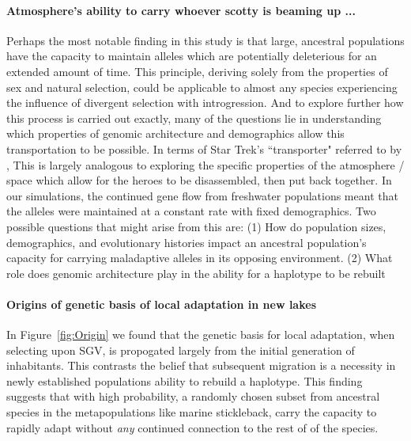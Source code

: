 \documentclass{article}
\begin{document}
 \paragraph{Atmosphere's ability to carry whoever scotty is beaming up ... }
Perhaps the most notable finding in this study is that large, ancestral populations have the capacity to maintain alleles which are potentially deleterious for an extended amount of time.  
This principle, deriving solely from the properties of sex and natural selection, could be applicable to almost any species experiencing the influence of divergent selection with introgression.
And to explore further how this process is carried out exactly, many of the questions lie in understanding which properties of genomic architecture and demographics allow this transportation to be possible. 
In terms of Star Trek's ``transporter" referred to by \citet{schluter2009genetics}, 
This is largely analogous to exploring the specific properties of the atmosphere / space which allow for the heroes to be disassembled, then put back together.
In our simulations, the continued gene flow from freshwater populations meant that the alleles were maintained at a constant rate with fixed demographics. 
Two possible questions that might arise from this are:
(1) How do population sizes, demographics, and evolutionary histories impact an ancestral population's capacity for carrying maladaptive alleles in its opposing environment.
(2) What role does genomic architecture play in the ability for a haplotype to be rebuilt
 
\paragraph{Origins of genetic basis of local adaptation in new lakes}
In Figure~\ref{fig:Origin} we found that the genetic basis for local adaptation, when selecting upon SGV, is propogated largely from the initial generation of inhabitants. 
This contrasts the belief that subsequent migration is a necessity in newly established populations ability to rebuild a haplotype.
This finding suggests that with high probability, a randomly chosen subset from ancestral species in the metapopulations like marine stickleback, 
carry the capacity to rapidly adapt without \emph{any} continued connection to the rest of of the species.
\end{document}
